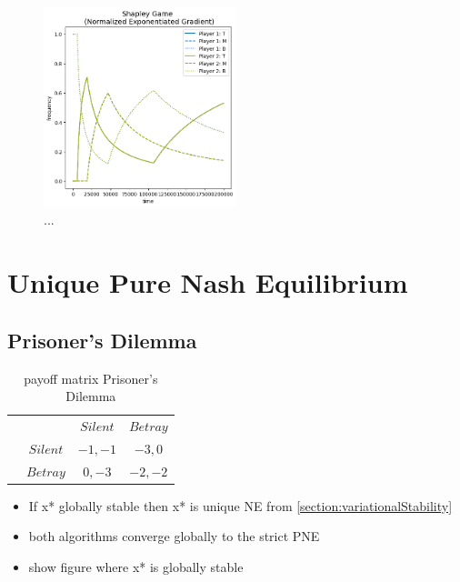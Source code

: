 \begin{figure}
    \centering
    \includegraphics[width=0.5\textwidth]{logos/Shapley2.png}
    \caption{...}
    \label{Shapley2}
\end{figure}



\section{Unique Pure Nash Equilibrium}\label{section:uniquePureNashEquilibrium}

\subsection{Prisoner's Dilemma}\label{subsection:prisonersDilemma}

\begin{table}\centering
\setlength{\extrarowheight}{2pt}
\begin{tabular}{cc|c|c|}
  & \multicolumn{1}{c}{} & \multicolumn{1}{c}{$Silent$}  & \multicolumn{1}{c}{$Betray$} \\\cline{3-4}
  & $Silent$ & $-1,-1$ & $-3,0$ \\\cline{3-4}
  & $Betray$ & $0,-3$ & $-2,-2$ \\\cline{3-4}
\end{tabular}\caption{\label{tab:payoffPrisoners}payoff matrix Prisoner's Dilemma}
\end{table}

\begin{itemize}
    \item If x* globally stable then x* is unique NE from \ref{section:variationalStability}
    \item both algorithms converge globally to the strict PNE
    \item show figure where x* is globally stable
\end{itemize}

